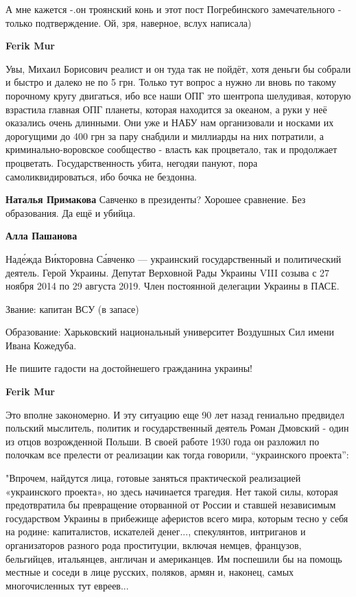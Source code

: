 \begin{itemize}
\begin{itemize}

А мне кажется -.он троянский конь и этот пост Погребинского замечательного -
только подтверждение. Ой, зря, наверное, вслух написала)

\textbf{Ferik Mur} 

Увы, Михаил Борисович реалист и он туда так не пойдёт, хотя деньги бы собрали и
быстро и далеко не по 5 грн. Только тут вопрос а нужно ли вновь по такому
порочному кругу двигаться, ибо все наши ОПГ это шентропа шелудивая, которую
взрастила главная ОПГ планеты, которая находится за океаном, а руки у неё
оказались очень длинными. Они уже и НАБУ нам организовали и носками их
дорогущими до 400 грн за пару снабдили и миллиарды на них потратили, а
криминально-воровское сообщество - власть как процветало, так и продолжает
процветать. Государственность убита, негодяи пануют, пора самоликвидироваться,
ибо бочка не бездонна.

\textbf{Наталья Примакова} Савченко в президенты? Хорошее сравнение. Без образования. Да ещё и убийца.

\textbf{Алла Пашанова} 

Наде́жда Ви́кторовна Са́вченко — украинский государственный и политический
деятель. Герой Украины. Депутат Верховной Рады Украины VIII созыва с 27 ноября
2014 по 29 августа 2019. Член постоянной делегации Украины в ПАСЕ.

Звание: капитан ВСУ (в запасе)

Образование: Харьковский национальный университет Воздушных Сил имени Ивана
Кожедуба.

Не пишите гадости на достойнешего гражданина украины!


\textbf{Ferik Mur} 

Это вполне закономерно. И эту ситуацию еще 90 лет назад гениально предвидел
польский мыслитель, политик и государственный деятель Роман Дмовский - один из
отцов возрожденной Польши. В своей работе 1930 года он разложил по полочкам все
прелести от реализации как тогда говорили, \enquote{украинского проекта}:

"Впрочем, найдутся лица, готовые заняться практической реализацией «украинского
проекта», но здесь начинается трагедия. Нет такой силы, которая предотвратила
бы превращение оторванной от России и ставшей независимым государством Украины
в прибежище аферистов всего мира, которым тесно у себя на родине: капиталистов,
искателей денег..., спекулянтов, интриганов и организаторов разного рода
проституции, включая немцев, французов, бельгийцев, итальянцев, англичан и
американцев. Им поспешили бы на помощь местные и соседи в лице русских,
поляков, армян и, наконец, самых многочисленных тут евреев...


\end{itemize}
\end{itemize}
